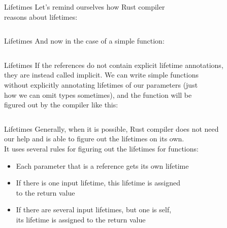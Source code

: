 \documentclass[usenames,dvipsnames,10pt,aspectratio=169]{beamer}
\begin{document}
\begin{frame}{Lifetimes}
	\large
	Let's remind ourselves how Rust compiler\\
	reasons about lifetimes:\\
	\vspace{0.3cm}
	\inputminted[fontsize=\large]{rust}{code/lifetimes1.rs}
\end{frame}

\begin{frame}{Lifetimes}
	\large
	And now in the case of a simple function:
	\vspace{0.5cm}
	\inputminted[fontsize=\large]{rust}{code/lifetimes2.rs}
\end{frame}

\begin{frame}{Lifetimes}
	\large
	If the references do not contain explicit lifetime annotations,\\
	they are instead called implicit. We can write simple functions\\
	without explicitly annotating lifetimes of our parameters (just\\
	how we can omit types sometimes), and the function will be\\
	figured out by the compiler like this:\\
	\vspace{0.2cm}
	\inputminted[fontsize=\large]{rust}{code/lifetimes3.rs}
\end{frame}

\begin{frame}{Lifetimes}
	\large
	Generally, when it is possible, Rust compiler does not need\\
	our help and is able to figure out the lifetimes on its own.\\
	\vspace{0.4cm}
	It uses several rules for figuring out the lifetimes for functions:\\
	\begin{itemize}[label=$\bullet$]
		\item Each parameter that is a reference gets its own lifetime
		\item If there is one input lifetime, this lifetime is assigned\\
			to the return value
		\item If there are several input lifetimes, but one is \textcolor{ucuyellow}{self},\\
			its lifetime is assigned to the return value
	\end{itemize}
\end{frame}
\end{document}

